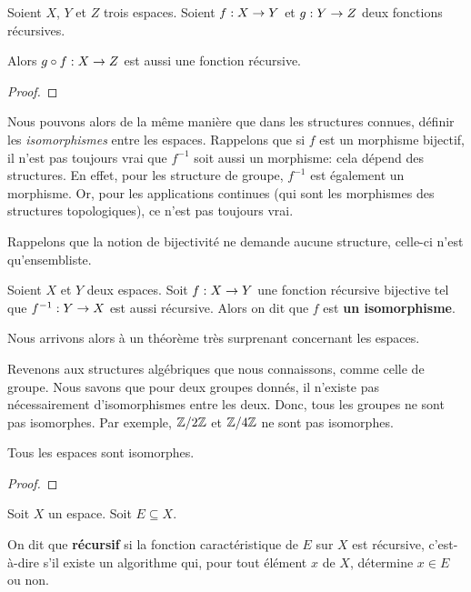 \begin{proposition}
	Soient $X$, $Y$ et $Z$ trois espaces.
	Soient $f : X \rightarrow Y$ et $g : Y \rightarrow Z$ deux fonctions
	récursives.

	Alors $g \circ f : X \rightarrow Z$ est aussi une fonction récursive.
\end{proposition}

\ifdefined\outproof
\begin{proof}

\end{proof}
\fi

Nous pouvons alors de la même manière que dans les structures connues, définir
les \textit{isomorphismes} entre les espaces.
Rappelons que si $f$ est un morphisme bijectif, il n'est pas toujours vrai que
$f^{-1}$ soit aussi un morphisme: cela dépend des structures. En effet, pour les
structure de groupe, $f^{-1}$ est également un morphisme. Or, pour les
applications continues (qui sont les morphismes des structures topologiques),
ce n'est pas toujours vrai.

Rappelons que la notion de bijectivité ne demande aucune structure, celle-ci
n'est qu'ensembliste.

\begin{definition}
	Soient $X$ et $Y$ deux espaces.
	Soit $f : X \rightarrow Y$ une fonction récursive bijective tel que
	$f^{-1} : Y \rightarrow X$ est aussi récursive.
	Alors on dit que $f$ est \textbf{un isomorphisme}.
\end{definition}

Nous arrivons alors à un théorème très surprenant concernant les espaces.

Revenons aux structures algébriques que nous connaissons, comme celle de groupe.
Nous savons que pour deux groupes donnés, il n'existe pas nécessairement
d'isomorphismes entre les deux. Donc, tous les groupes ne sont pas isomorphes.
Par exemple, $\mathbb{Z}/2\mathbb{Z}$ et $\mathbb{Z}/4\mathbb{Z}$ ne sont pas
isomorphes.

\begin{theorem}
	\label{theorem:isomorphism_theorem}
	Tous les espaces sont isomorphes.
\end{theorem}

\ifdefined\outputproof
\begin{proof}

\end{proof}
\fi

\begin{definition}
	Soit $X$ un espace. Soit $E \subseteq X$.

	On dit que \textbf{récursif} si la fonction caractéristique de $E$ sur $X$
	est récursive, c'est-à-dire s'il existe un algorithme qui, pour tout élément
	$x$ de $X$, détermine $x \in E$ ou non.
\end{definition}

